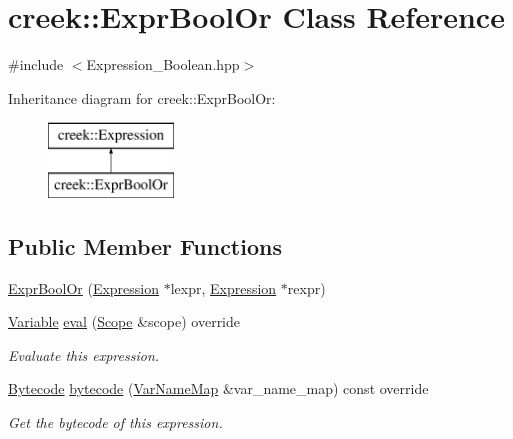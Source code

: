 \hypertarget{classcreek_1_1_expr_bool_or}{}\section{creek\+:\+:Expr\+Bool\+Or Class Reference}
\label{classcreek_1_1_expr_bool_or}


{\ttfamily \#include $<$Expression\+\_\+\+Boolean.\+hpp$>$}

Inheritance diagram for creek\+:\+:Expr\+Bool\+Or\+:\begin{figure}[H]
\begin{center}
\leavevmode
\includegraphics[height=2.000000cm]{classcreek_1_1_expr_bool_or}
\end{center}
\end{figure}
\subsection*{Public Member Functions}
\begin{DoxyCompactItemize}
\item 
\hyperlink{classcreek_1_1_expr_bool_or_ad20096f889a97084b069c474a54abeee}{Expr\+Bool\+Or} (\hyperlink{classcreek_1_1_expression}{Expression} $\ast$lexpr, \hyperlink{classcreek_1_1_expression}{Expression} $\ast$rexpr)
\item 
\hyperlink{classcreek_1_1_variable}{Variable} \hyperlink{classcreek_1_1_expr_bool_or_a359cd14a552c56000e8b687c1e58df72}{eval} (\hyperlink{classcreek_1_1_scope}{Scope} \&scope) override
\begin{DoxyCompactList}\small\item\em Evaluate this expression. \end{DoxyCompactList}\item 
\hyperlink{classcreek_1_1_bytecode}{Bytecode} \hyperlink{classcreek_1_1_expr_bool_or_ad6d7518f9590b072b5797c37c51dfd92}{bytecode} (\hyperlink{classcreek_1_1_var_name_map}{Var\+Name\+Map} \&var\+\_\+name\+\_\+map) const  override\hypertarget{classcreek_1_1_expr_bool_or_ad6d7518f9590b072b5797c37c51dfd92}{}\label{classcreek_1_1_expr_bool_or_ad6d7518f9590b072b5797c37c51dfd92}

\begin{DoxyCompactList}\small\item\em Get the bytecode of this expression. \end{DoxyCompactList}\end{DoxyCompactItemize}


